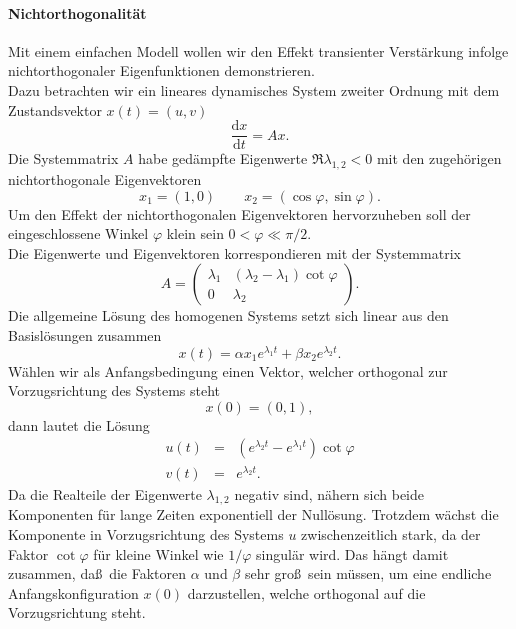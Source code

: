 \paragraph{Nichtorthogonalit\"at}
Mit einem einfachen Modell wollen wir den Effekt transienter Verst\"arkung infolge nichtorthogonaler Eigenfunktionen demonstrieren.\\
Dazu betrachten wir ein lineares dynamisches System zweiter Ordnung mit dem Zustandsvektor $x(t)=(u,v)$
\begin{equation}
	\frac{\mathrm{d}x}{\mathrm{d}t} = Ax.
\end{equation}
Die Systemmatrix $A$ habe ged\"ampfte Eigenwerte $\Re\lambda_{1,2}<0$ mit den zugeh\"origen nichtorthogonale Eigenvektoren
\begin{equation}
	x_1 = (1,0) \qquad x_2 = (\cos{\varphi},\sin\varphi).
\end{equation}
Um den Effekt der nichtorthogonalen Eigenvektoren hervorzuheben soll der eingeschlossene Winkel $\varphi$ klein sein $0<\varphi\ll\pi/2$.\\
Die Eigenwerte und Eigenvektoren korrespondieren mit der Systemmatrix
\begin{equation}
	A = \begin{pmatrix}\lambda_1&(\lambda_2-\lambda_1)\cot\varphi\\0&\lambda_2\end{pmatrix}.
\end{equation}
Die allgemeine L\"osung des homogenen Systems setzt sich linear aus den Basisl\"osungen zusammen
\begin{equation}
	x(t) = \alpha x_1 e^{\lambda_1 t} + \beta x_2 e^{\lambda_2 t}.
\end{equation}
W\"ahlen wir als Anfangsbedingung einen Vektor, welcher orthogonal zur Vorzugsrichtung des Systems steht
\begin{equation}
	x(0) = (0,1),
\end{equation}
dann lautet die L\"osung
\begin{eqnarray}
	u(t) &=& (e^{\lambda_2 t} - e^{\lambda_1 t}) \cot\varphi \\
	v(t) &=& e^{\lambda_2 t}.
\end{eqnarray}
Da die Realteile der Eigenwerte $\lambda_{1,2}$ negativ sind, n\"ahern sich beide Komponenten f\"ur lange Zeiten exponentiell der Null\"osung.
Trotzdem w\"achst die Komponente in Vorzugsrichtung des Systems $u$ zwischenzeitlich stark, da der Faktor $\cot\varphi$ f\"ur kleine Winkel wie $1/\varphi$ singul\"ar wird.
Das h\"angt damit zusammen, da\ss\ die Faktoren $\alpha$ und $\beta$ sehr gro\ss\ sein m\"ussen, um eine endliche Anfangskonfiguration $x(0)$ darzustellen, welche orthogonal auf die Vorzugsrichtung steht.
